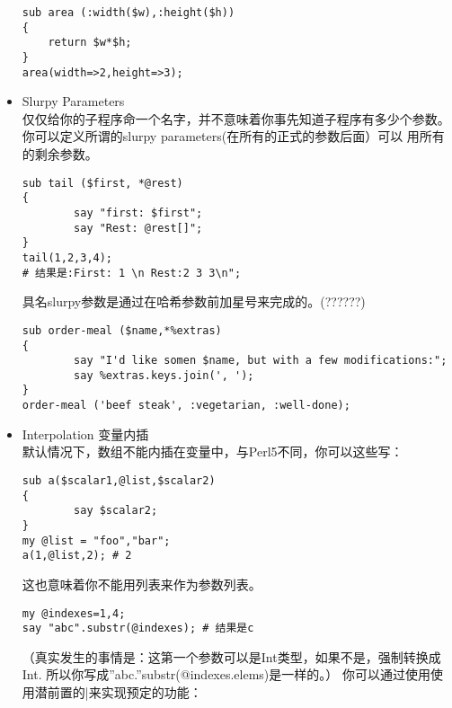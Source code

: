 \documentclass{ctexart}
\begin{document}
\begin{itemize}
\begin{lstlisting}
sub area (:width($w),:height($h))
{
    return $w*$h;
}
area(width=>2,height=>3);
\end{lstlisting}

\item Slurpy Parameters\\
\label{sec-4-5-2-2}%
仅仅给你的子程序命一个名字，并不意味着你事先知道子程序有多少个参数。
你可以定义所谓的slurpy parameters(在所有的正式的参数后面）可以
用所有的剩余参数。

\begin{lstlisting}
sub tail ($first, *@rest)
{
        say "first: $first";
        say "Rest: @rest[]";
}
tail(1,2,3,4);
# 结果是:First: 1 \n Rest:2 3 3\n";
\end{lstlisting}
具名slurpy参数是通过在哈希参数前加星号来完成的。(??????)

\begin{lstlisting}
sub order-meal ($name,*%extras)
{
        say "I'd like somen $name, but with a few modifications:";
        say %extras.keys.join(', ');
}
order-meal ('beef steak', :vegetarian, :well-done);
\end{lstlisting}

\item Interpolation 变量内插\\
\label{sec-4-5-2-3}%
默认情况下，数组不能内插在变量中，与Perl5不同，你可以这些写：

\begin{lstlisting}
sub a($scalar1,@list,$scalar2)
{
        say $scalar2;
}
my @list = "foo","bar";
a(1,@list,2); # 2
\end{lstlisting}
这也意味着你不能用列表来作为参数列表。

\begin{lstlisting}
my @indexes=1,4;
say "abc".substr(@indexes); # 结果是c
\end{lstlisting}
（真实发生的事情是：这第一个参数可以是Int类型，如果不是，强制转换成Int.
所以你写成''abc.''substr(@indexes.elems)是一样的。）
你可以通过使用使用潜前置的|来实现预定的功能：


\end{itemize}
\end{document}
